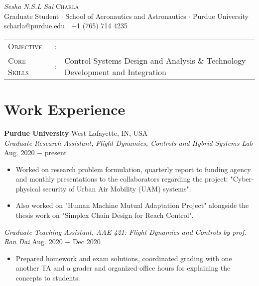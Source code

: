 \documentclass[letterpaper,10pt]{article}
\begin{document}
\begin{center}
\thispagestyle{empty}
\huge{\textit{Sesha N.S.L Sai} \textsc{Charla }}\\
\small Graduate Student $\cdot$ School of Aeronautics and Astronautics $\cdot$ Purdue University\\
\small scharla@purdue.edu $\mid$ +1 (765) 714 4235   \\
\end{center}



\begin{tabular}{l c l}
	{\large{\textsc{Objective}}}&:& \\
	{\large{\textsc{Core Skills}}}&:& Control Systems Design and Analysis \& Technology Development and Integration %
\end{tabular}


\section{Work Experience} 
\noindent \textbf{Purdue University} \hfill West Lafayette, IN, USA \\
\noindent \textit{Graduate Research Assistant, Flight Dynamics, Controls and Hybrid Systems Lab} \hfill Aug. 2020 $-$ present
\begin{itemize}[noitemsep,nolistsep,leftmargin=0.25in,label={--}]
    \item Worked on research problem formulation, quarterly report to funding agency and monthly presentations to the collaborators regarding the project: "Cyber-physical security of Urban Air Mobility (UAM) systems".
    \item Also worked on "Human Machine Mutual Adaptation Project" alongside the thesis work on "Simplex Chain Design for Reach Control".
\end{itemize}

\vspace{3pt}
\noindent \textit{Graduate Teaching Assistant, AAE 421: Flight Dynamics and Controls by prof. Ran Dai} \hfill Aug. 2020 $-$ Dec 2020
\begin{itemize}[noitemsep,nolistsep,leftmargin=0.25in,label={--}]
    \item Prepared homework and exam solutions, coordinated grading with one another TA and a grader and organized office hours for explaining the concepts to students.
\end{itemize}
\end{document}
